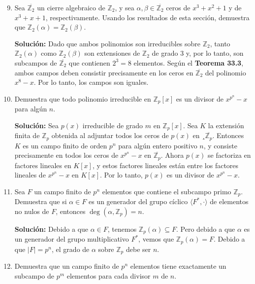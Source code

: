 \begin{enumerate}
    \setcounter{enumi}{8}
    \item Sea $\overline{\mathbb{Z}_2}$ un cierre algebraico de $\mathbb{Z}_2$, y sea $\alpha, \beta \in \overline{\mathbb{Z}_2}$ ceros de $x^3 + x^2 + 1$ y de $x^3 + x + 1$, respectivamente. Usando los resultados de esta sección, demuestra que $\mathbb{Z}_2(\alpha) = \mathbb{Z}_2(\beta)$.
    
    \textbf{Solución:} Dado que ambos polinomios son irreducibles sobre $\mathbb{Z}_2$, tanto $\mathbb{Z}_2(\alpha)$ como $\mathbb{Z}_2(\beta)$ son extensiones de $\mathbb{Z}_2$ de grado 3 y, por lo tanto, son subcampos de $\overline{\mathbb{Z}_2}$ que contienen $2^3 = 8$ elementos. Según el  \textbf{Teorema 33.3}, ambos campos deben consistir precisamente en los ceros en $\overline{\mathbb{Z}_2}$ del polinomio $x^8 - x$. Por lo tanto, los campos son iguales.

    \item Demuestra que todo polinomio irreducible en $\mathbb{Z}_p[x]$ es un divisor de $x^{p^n} - x$ para algún $n$.
    
    \textbf{Solución:} Sea $p(x)$ irreducible de grado $m$ en $\mathbb{Z}_p[x]$. Sea $K$ la extensión finita de $\mathbb{Z}_p$ obtenida al adjuntar todos los ceros de $p(x)$ en $¸\overline{\mathbb{Z}_p}$. Entonces $K$ es un campo finito de orden $p^n$ para algún entero positivo $n$, y consiste precisamente en todos los ceros de $x^{p^n} - x$ en $ \overline{\mathbb{Z}_p}$. Ahora $p(x)$ se factoriza en factores lineales en $K[x]$, y estos factores lineales están entre los factores lineales de $x^{p^n} - x$ en $K[x]$. Por lo tanto, $p(x)$ es un divisor de $x^{p^n} - x$.

    \item Sea $F$ un campo finito de $p^n$ elementos que contiene el subcampo primo $\mathbb{Z}_p$. Demuestra que si $\alpha \in F$ es un generador del grupo cíclico $\langle F^*, \cdot \rangle$ de elementos no nulos de $F$, entonces $\deg(\alpha, \mathbb{Z}_p) = n$.
    
    \textbf{Solución:} Debido a que $\alpha \in F$, tenemos $\mathbb{Z}_p(\alpha) \subseteq F$. Pero debido a que $\alpha$ es un generador del grupo multiplicativo $F^*$, vemos que $\mathbb{Z}_p(\alpha) = F$. Debido a que $|F| = p^n$, el grado de $\alpha$ sobre $\mathbb{Z}_p$ debe ser $n$.

    \item Demuestra que un campo finito de $p^n$ elementos tiene exactamente un subcampo de $p^m$ elementos para cada divisor $m$ de $n$.
    

\end{enumerate}
